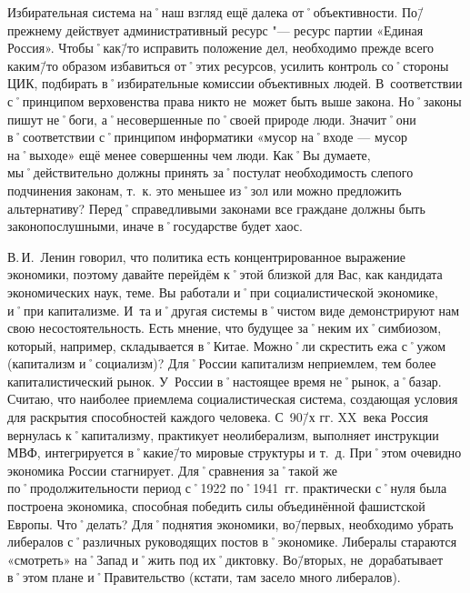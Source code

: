 \begin{drama}
	\michaelspeaks Избирательная система на˚наш взгляд ещё далека от˚объективности. По\=/прежнему действует административный ресурс "--- ресурс партии «Единая Россия». Чтобы˚как\=/то исправить положение дел, необходимо прежде всего каким\=/то образом избавиться от˚этих ресурсов, усилить контроль со˚стороны ЦИК, подбирать в˚избирательные комиссии объективных людей.	
	\maxspeaks В~соответствии с˚принципом верховенства права никто не~может быть выше закона. Но˚законы пишут не˚боги, а˚несовершенные по˚своей природе люди. Значит˚они в˚соответствии с˚принципом информатики  «мусор на˚входе — мусор на˚выходе» ещё менее совершенны чем люди. Как˚Вы думаете, мы˚действительно должны принять за˚постулат необходимость слепого подчинения законам, т.~к. это меньшее из˚зол или можно предложить альтернативу?
	\michaelspeaks Перед˚справедливыми законами все граждане должны быть законопослушными, иначе в˚государстве будет хаос.

	\maxspeaks В.\,И.~Ленин говорил, что политика есть концентрированное выражение экономики, поэтому давайте перейдём к˚этой близкой для Вас, как кандидата экономических наук, теме. Вы работали и˚при социалистической экономике, и˚при капитализме. И~та и˚другая системы в˚чистом виде демонстрируют нам свою несостоятельность. Есть мнение, что будущее за˚неким их˚симбиозом, который, например, складывается в˚Китае. Можно˚ли скрестить ежа с˚ужом (капитализм и˚социализм)?
	\michaelspeaks Для˚России капитализм неприемлем, тем более капиталистический рынок. У~России в˚настоящее время не˚рынок, а˚базар. Считаю, что наиболее приемлема социалистическая система, создающая условия для раскрытия способностей каждого человека.
	\maxspeaks С~90\=/х гг. XX~века Россия вернулась к˚капитализму, практикует неолиберализм, выполняет инструкции МВФ, интегрируется в˚какие\=/то мировые структуры и т.~д. При˚этом очевидно экономика России стагнирует. Для˚сравнения за˚такой же по˚продолжительности период с˚1922 по˚1941~гг. практически с˚нуля была построена экономика, способная победить силы объединённой фашистской Европы. Что˚делать? 
	\michaelspeaks Для˚поднятия экономики, во\=/первых, необходимо убрать либералов с˚различных руководящих постов в˚экономике. Либералы стараются «смотреть» на˚Запад и˚жить под их˚диктовку. Во\=/вторых, не~дорабатывает в˚этом плане и˚Правительство (кстати, там засело много либералов).


\end{drama}

